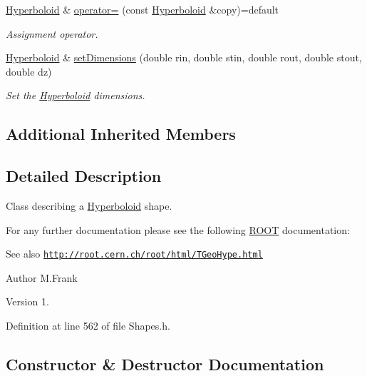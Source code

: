 \begin{DoxyCompactItemize}
\hyperlink{class_d_d4hep_1_1_geometry_1_1_hyperboloid}{Hyperboloid} \& \hyperlink{class_d_d4hep_1_1_geometry_1_1_hyperboloid_a33a7c8a8077d9cee5e47ae9d3fa7722c}{operator=} (const \hyperlink{class_d_d4hep_1_1_geometry_1_1_hyperboloid}{Hyperboloid} \&copy)=default
\begin{DoxyCompactList}\small\item\em Assignment operator. \end{DoxyCompactList}\item 
\hyperlink{class_d_d4hep_1_1_geometry_1_1_hyperboloid}{Hyperboloid} \& \hyperlink{class_d_d4hep_1_1_geometry_1_1_hyperboloid_a17bc3db816fee3f9486603fb799063e2}{set\+Dimensions} (double rin, double stin, double rout, double stout, double dz)
\begin{DoxyCompactList}\small\item\em Set the \hyperlink{class_d_d4hep_1_1_geometry_1_1_hyperboloid}{Hyperboloid} dimensions. \end{DoxyCompactList}\end{DoxyCompactItemize}
\subsection*{Additional Inherited Members}


\subsection{Detailed Description}
Class describing a \hyperlink{class_d_d4hep_1_1_geometry_1_1_hyperboloid}{Hyperboloid} shape. 

For any further documentation please see the following \hyperlink{namespace_r_o_o_t}{R\+O\+OT} documentation\+: \begin{DoxySeeAlso}{See also}
\href{http://root.cern.ch/root/html/TGeoHype.html}{\tt http\+://root.\+cern.\+ch/root/html/\+T\+Geo\+Hype.\+html}
\end{DoxySeeAlso}
\begin{DoxyAuthor}{Author}
M.\+Frank 
\end{DoxyAuthor}
\begin{DoxyVersion}{Version}
1. 
\end{DoxyVersion}


Definition at line 562 of file Shapes.\+h.



\subsection{Constructor \& Destructor Documentation}
\hypertarget{class_d_d4hep_1_1_geometry_1_1_hyperboloid_a52e3a903cc933750c3b530d0dfcfffc2}{}\label{class_d_d4hep_1_1_geometry_1_1_hyperboloid_a52e3a903cc933750c3b530d0dfcfffc2} 
